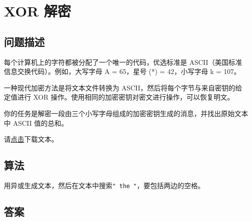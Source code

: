 \section{XOR 解密}
\subsection{问题描述}
\begin{tcolorbox}

	每个计算机上的字符都被分配了一个唯一的代码，优选标准是 ASCII（美国标准信息交换代码）。例如，大写字母 A = 65，星号 (*) = 42，小写字母 k = 107。

	一种现代加密方法是将文本文件转换为 ASCII，然后将每个字节与来自密钥的给定值进行 XOR 操作。使用相同的加密密钥对密文进行操作，可以恢复明文。

	你的任务是解密一段由三个小写字母组成的加密密钥生成的消息，并找出原始文本中 ASCII 值的总和。

	请\href{https://projecteuler.net/resources/documents/0059_cipher.txt}{点击}下载文本。
\end{tcolorbox}

\subsection{算法}
用异或生成文本，然后在文本中搜索\texttt{" the "}，要包括两边的空格。

\subsection{答案}
